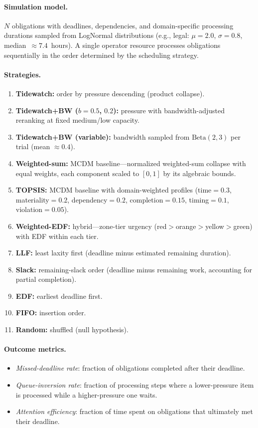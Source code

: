 \documentclass[11pt]{article}
\begin{document}
\paragraph{Simulation model.}
$N$ obligations with deadlines, dependencies, and
domain-specific processing durations sampled from LogNormal
distributions (e.g., legal: $\mu = 2.0$, $\sigma = 0.8$,
median~$\approx 7.4$~hours).
A single operator resource processes obligations sequentially in the
order determined by the scheduling strategy.

\paragraph{Strategies.}
\begin{enumerate}[nosep]
  \item \textbf{Tidewatch:} order by pressure descending (product collapse).
  \item \textbf{Tidewatch+BW ($b{=}0.5$, $0.2$):} pressure with
        bandwidth-adjusted reranking at fixed medium/low capacity.
  \item \textbf{Tidewatch+BW (variable):} bandwidth sampled from
        $\text{Beta}(2, 3)$ per trial (mean $\approx 0.4$).
  \item \textbf{Weighted-sum:} MCDM baseline---normalized
        weighted-sum collapse with equal weights, each component
        scaled to $[0, 1]$ by its algebraic bounds.
  \item \textbf{TOPSIS:} MCDM baseline with domain-weighted
        profiles (time${}=0.3$, materiality${}=0.2$,
        dependency${}=0.2$, completion${}=0.15$,
        timing${}=0.1$, violation${}=0.05$).
  \item \textbf{Weighted-EDF:} hybrid---zone-tier urgency
        (red$>$orange$>$yellow$>$green) with EDF within each tier.
  \item \textbf{LLF:} least laxity first (deadline minus estimated
        remaining duration).
  \item \textbf{Slack:} remaining-slack order (deadline minus
        remaining work, accounting for partial completion).
  \item \textbf{EDF:} earliest deadline first.
  \item \textbf{FIFO:} insertion order.
  \item \textbf{Random:} shuffled (null hypothesis).
\end{enumerate}

\paragraph{Outcome metrics.}
\begin{itemize}[nosep]
  \item \emph{Missed-deadline rate}: fraction of obligations
        completed after their deadline.
  \item \emph{Queue-inversion rate}: fraction of processing steps
        where a lower-pressure item is processed while a
        higher-pressure one waits.
  \item \emph{Attention efficiency}: fraction of time spent on
        obligations that ultimately met their deadline.
\end{itemize}
\end{document}
